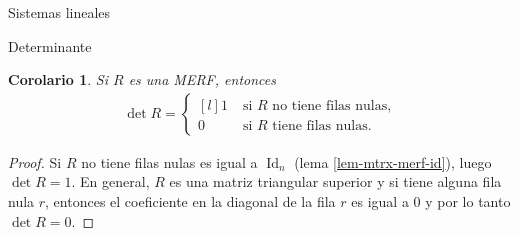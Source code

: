\documentclass[a4paper,12pt,twoside,spanish,reqno]{amsbook}
\numberwithin{equation}{section}
\newtheorem{corolario}[teorema]{Corolario}
\theoremstyle{definition}
\theoremstyle{remark}
\newcommand{\Id}{\operatorname{Id}}
\begin{document}
\begin{chapter}{Sistemas lineales}
\begin{section}{Determinante}
    \begin{corolario}\label{cor-det-merf}
        Si $R$ es una MERF, entonces 
        \begin{align*}
        \det R = \left\{ \begin{matrix*}[l]
        1 \;&\text{si $R$ no tiene filas nulas,}\\
        0&\text{si $R$ tiene filas nulas.}
        \end{matrix*}\right.  
        \end{align*}
    \end{corolario}
    \begin{proof}
        Si $R$ no tiene filas nulas es igual a $\Id_n$ (lema \ref{lem-mtrx-merf-id}), luego $\det R = 1$. En general, $R$ es una matriz triangular superior y si tiene alguna fila nula $r$, entonces el coeficiente en la diagonal de la fila $r$ es igual a $0$ y por lo tanto 	$\det R = 0$.
    \end{proof}


\end{section}
\end{chapter}
\end{document}
